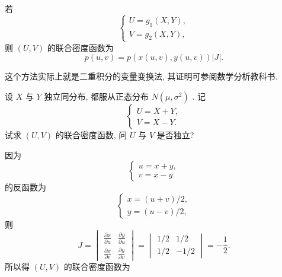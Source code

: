     若
    \begin{equation*}
    	\begin{cases}
    	U=g_{1}(X,Y),\\
    	V=g_{2}(X,Y),
    	\end{cases}
    \end{equation*}
    则 $(U,V)$ 的联合密度函数为
    \begin{equation}\label{eq:3.3.20}
    	p(u,v)=p(x(u,v),y(u,v))|J|.
    \end{equation}
    
    这个方法实际上就是二重积分的变量变换法, 其证明可参阅数学分析教科书.
    \begin{example}\label{exam:3.3.9}
    	设 $X$ 与 $Y$ 独立同分布, 都服从正态分布 $N(\mu,\sigma^2)$ . 记
    	\begin{equation*}
    		\begin{cases}
    		U=X+Y,\\
    		V=X-Y.
    		\end{cases}
    	\end{equation*}
    	试求 $(U,V)$ 的联合密度函数, 问 $U$ 与 $V$ 是否独立?
    	\begin{solution}
    		因为
    		\begin{equation*}
    			\begin{cases}
    			u=x+y,\\
    			v=x-y
    			\end{cases}
    		\end{equation*}
    		的反函数为
    		\begin{equation*}
    			\begin{cases}
    			x=(u+v)/2,\\
    			y=(u-v)/2,
    			\end{cases}
    		\end{equation*}
    		则
    		\begin{equation*}
    			J=
    			\begin{vmatrix}
    			\frac{\partial x}{\partial u} & \frac{\partial y}{\partial u}\\
    			\frac{\partial x}{\partial v} & \frac{\partial y}{\partial v}
    			\end{vmatrix}
    			=
    			\begin{vmatrix}
    			1/2 & 1/2\\
    			1/2 & -1/2
    			\end{vmatrix}
    			=-\frac{1}{2}.
    		\end{equation*}
    		所以得 $(U,V)$ 的联合密度函数为

\end{solution}
\end{example}
